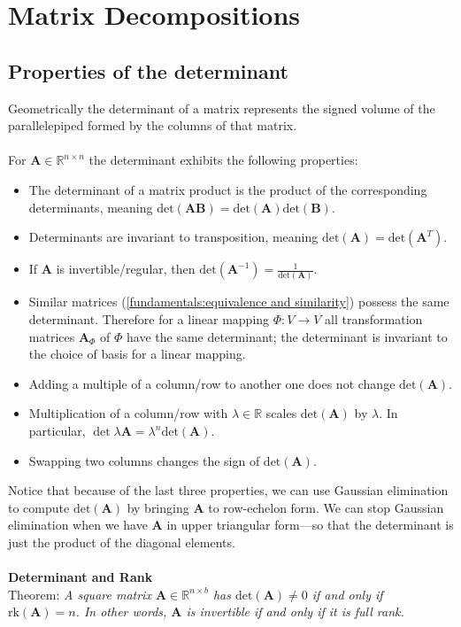 \documentclass{report}
\begin{document}
\section{Matrix Decompositions} %
\subsection{Properties of the determinant}
Geometrically the determinant of a matrix represents the signed volume of the parallelepiped formed
by the columns of that matrix.\\
\vspace{1mm}\\
For $\bm{A}\in\mathbb{R}^{n\times n}$ the determinant exhibits the following properties:
\begin{itemize}
\item The determinant of a matrix product is the product of the corresponding determinants, meaning
$\text{det}(\bm{AB})=\text{det}(\bm{A})\text{det}(\bm{B})$.
\item Determinants are invariant to transposition, meaning
$\text{det}(\bm{A})=\text{det}(\bm{A}^T)$.
\item If $\bm{A}$ is invertible/regular, then $\text{det}(\bm{A}^{-1})=\frac{1}{\text{det}(\bm{A})}$.
\item Similar matrices (\ref{fundamentals:equivalence and similarity}) possess the same determinant.
Therefore for a linear mapping $\Phi:V\to V$ all transformation matrices $\bm{A}_\Phi$ of $\Phi$ have the same
determinant; the determinant is invariant to the choice of basis for a linear mapping.
\item Adding a multiple of a column/row to another one does not change $\text{det}(\bm{A})$.
\item Multiplication of a column/row with $\lambda\in\mathbb{R}$ scales $\text{det}(\bm{A})$
by $\lambda$. In particular, $\det{\lambda\bm{A}}=\lambda^n\text{det}(\bm{A})$.
\item Swapping two columns changes the sign of $\text{det}(\bm{A})$.
\end{itemize}
Notice that because of the last three properties, we can use Gaussian elimination to compute $\text{det}(\bm{A})$
by bringing $\bm{A}$ to row-echelon form. We can stop Gaussian elimination when we have $\bm{A}$
in upper triangular form---so that the determinant 
is just the product of the diagonal elements.\\
\vspace{1mm}\\
\textbf{Determinant and Rank}\\
Theorem: \textit{A square matrix $\bm{A}\in\mathbb{R}^{n\times b}$ has $\text{det}(\bm{A})\neq0$ if and only
if $\text{rk}(\bm{A})=n$. In other words, $\bm{A}$ is invertible if and only if it is full rank.}
\newpage
\end{document}
